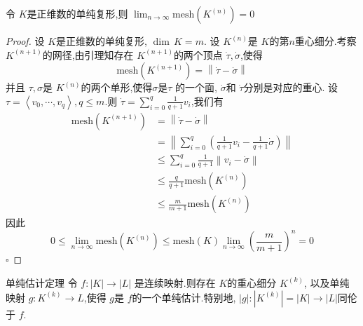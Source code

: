 \documentclass[../../几何与拓扑.tex]{subfiles}
\begin{document}
\begin{theorem}
    令 \(  K  \)是正维数的单纯复形,则 \(  \lim_{n \to \infty} \mathrm{mesh}\left( K^{\left( n \right) } \right)= 0   \)  
\end{theorem}

\begin{proof}
    设 \(  K  \)是正维数的单纯复形,  \(  \operatorname{dim}\,K= m  \).
    设 \(  K^{\left( n \right) }  \)是 \(  K  \)的第\(  n  \)重心细分.考察 \(  K^{\left( n+ 1 \right) }  \)的网径,由引理知存在 \(  K^{\left( n+ 1 \right) }  \)的两个顶点 \(  \dot{\tau}, \dot{\sigma}  \),使得  \[
    \mathrm{mesh}\left( K^{\left( n+ 1 \right) } \right) =  \left\| \dot{\tau}-  \dot{\sigma} \right\| 
    \]并且 \(  \tau , \sigma   \)是 \(  K^{\left( n \right) }  \)的两个单形,使得\(   \sigma   \)是\(  \tau   \) 的一个面, \(   \dot{\sigma}  \)和 \(  \dot{\tau}  \)分别是对应的重心.         
    设 \(   \tau  =  \left<  v_0,\cdots,v_{q}    \right>   ,q \le m\).则 \(   \dot{\tau}=  \sum _{i= 0}^{q} \frac{1}{q+ 1} v_{i} \),我们有 \[
    \begin{aligned}
    \mathrm{mesh}\left( K^{\left( n+ 1 \right) } \right)  & =  \left\| \dot{\tau}- \dot{\sigma} \right\|\\ 
     & =  \left\| \sum _{i= 0}^{q} \left( \frac{1}{q+ 1}v_{i}- \frac{1}{q+ 1} \dot{\sigma}  \right) \right\|\\ 
      & \le \sum _{i= 0}^{q} \frac{1}{q+ 1}\left\| v_{i}-  \dot{\sigma} \right\|\\ 
       & \le  \frac{q}{q+ 1} \mathrm{mesh}\left( K^{\left( n \right) } \right) \\ 
        & \le  \frac{m}{m+ 1} \mathrm{mesh}\left( K^{\left( n \right) } \right) 
    \end{aligned}
    \]  因此 \[
    0 \le  \lim_{n \to \infty} \mathrm{mesh}\left( K^{\left( n \right) } \right) \le  \mathrm{mesh}\left( K \right) \lim_{n \to \infty}\left( \frac{m}{m+ 1} \right)   ^{n} = 0
    \]
    \hfill $\square$
\end{proof}


\begin{theorem}{单纯估计定理}
    令 \(  f: \left| K \right|\to \left| L \right|    \) 是连续映射.则存在 \(  K  \)的重心细分 \(  K^{\left( k \right) }  \),
    以及单纯映射 \(  g: K^{\left( k \right) } \to L  \),使得 \(  g  \)是 \(  f  \)的一个单纯估计.特别地, \(  \left| g \right|: \left| K^{\left( k \right) }  \right|   = \left| K \right|\to \left| L \right|   \)同伦于 \(  f  \).       
\end{theorem}
\end{document}

